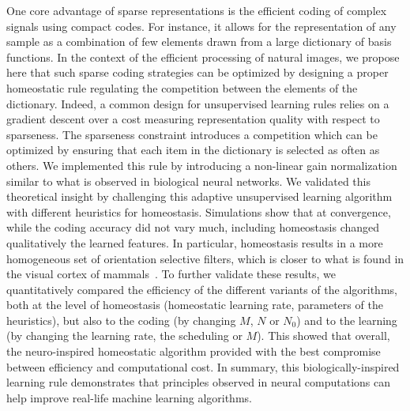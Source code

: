 \documentclass[a4paper, 11pt, draft]{article} %
\begin{document}
%
One core advantage of sparse representations is the efficient coding of complex signals using compact codes. For instance, it allows for the representation of any sample as a combination of few elements drawn from a large dictionary of basis functions. In the context of the efficient processing of natural images, we propose here that such sparse coding strategies can be optimized by designing a proper homeostatic rule regulating the competition between the elements of the dictionary. Indeed, a common design for unsupervised learning rules relies on a gradient descent over a cost measuring representation quality with respect to sparseness. The sparseness constraint introduces a competition which can be optimized by ensuring that each item in the dictionary is selected as often as others. We implemented this rule by introducing a non-linear gain normalization similar to what is observed in biological neural networks. We validated this theoretical insight by challenging this adaptive unsupervised learning algorithm with different heuristics for homeostasis. Simulations show that at convergence, while the coding accuracy did not vary much, including homeostasis changed qualitatively the learned features. In particular, homeostasis results in a more homogeneous set of orientation selective filters, which is closer to what is found in the visual cortex of mammals~\citep{Ringach02,Rehn07,Loxley17}. To further validate these results, we quantitatively compared the efficiency of the different variants of the algorithms, both at the level of homeostasis (homeostatic learning rate, parameters of the heuristics), but also to the coding (by changing $M$, $N$ or $N_0$) and to the learning (by changing the learning rate, the scheduling or $M$). This showed that overall, the neuro-inspired homeostatic algorithm provided with the best compromise between efficiency and computational cost. In summary, this biologically-inspired learning rule demonstrates that principles observed in neural computations can help improve real-life machine learning algorithms.
\end{document}
